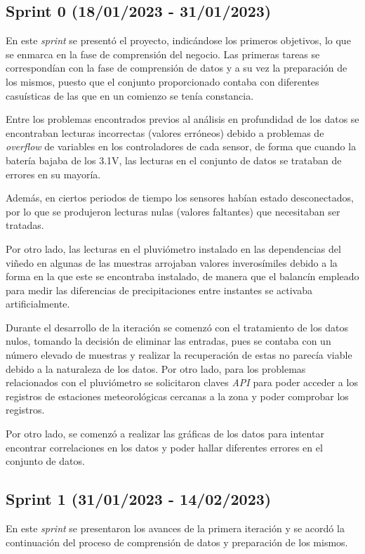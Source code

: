 \subsection{Sprint 0 (18/01/2023 - 31/01/2023)}
En este \textit{sprint} se presentó el proyecto, indicándose los primeros objetivos, lo que se enmarca en la fase de comprensión
del negocio.
Las primeras tareas se correspondían con la fase de comprensión de datos y a su vez la preparación de los mismos, 
puesto que el conjunto proporcionado contaba con diferentes casuísticas de las que en un comienzo se tenía constancia.

Entre los problemas encontrados previos al análisis en profundidad de los datos se encontraban lecturas incorrectas (valores erróneos) 
debido a problemas de \textit{overflow} de variables en los controladores de cada sensor, de forma que cuando la batería bajaba
de los 3.1V, las lecturas en el conjunto de datos se trataban de errores en su mayoría.

Además, en ciertos periodos de tiempo los sensores habían estado desconectados, por lo que se produjeron lecturas nulas (valores faltantes)
que necesitaban ser tratadas.

Por otro lado, las lecturas en el pluviómetro instalado en las dependencias del viñedo en algunas de las muestras arrojaban valores
inverosímiles debido a la forma en la que este se encontraba instalado, de manera que el balancín empleado para medir las diferencias de 
precipitaciones entre instantes se activaba artificialmente.

Durante el desarrollo de la iteración se comenzó con el tratamiento de los datos nulos, tomando la decisión de eliminar las entradas, pues se
contaba con un número elevado de muestras y realizar la recuperación de estas no parecía viable debido a la naturaleza de los datos.
Por otro lado, para los problemas relacionados con el pluviómetro se solicitaron claves \textit{API} para poder acceder a los registros 
de estaciones meteorológicas cercanas a la zona y poder comprobar los registros.

Por otro lado, se comenzó a realizar las gráficas de los datos para intentar encontrar correlaciones en los datos y poder hallar diferentes 
errores en el conjunto de datos.

\subsection{Sprint 1 (31/01/2023 - 14/02/2023)}
En este \textit{sprint} se presentaron los avances de la primera iteración y se acordó la continuación del proceso de comprensión de datos y 
preparación de los mismos.

